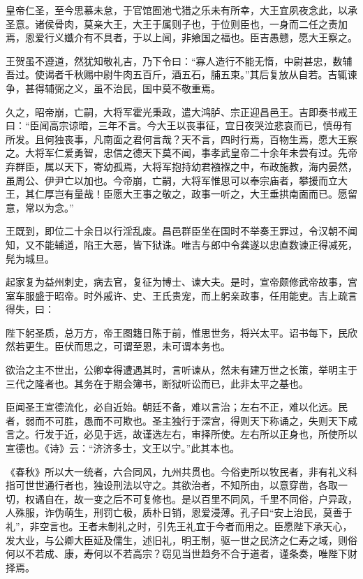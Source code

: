 \documentclass[]{article}
\begin{document}
皇帝仁圣，至今思慕未怠，于官馆囿池弋猎之乐未有所幸，大王宜夙夜念此，以承圣意。诸侯骨肉，莫亲大王，大王于属则子也，于位则臣也，一身而二任之责加焉，恩爱行义孅介有不具者，于以上闻，非飨国之福也。臣吉愚戆，愿大王察之。

王贺虽不遵道，然犹知敬礼吉，乃下令曰：``寡人造行不能无惰，中尉甚忠，数辅吾过。使谒者千秋赐中尉牛肉五百斤，酒五石，脯五束。''其后复放从自若。吉辄谏争，甚得辅弼之义，虽不治民，国中莫不敬重焉。

久之，昭帝崩，亡嗣，大将军霍光秉政，遣大鸿胪、宗正迎昌邑王。吉即奏书戒王曰：``臣闻高宗谅暗，三年不言。今大王以丧事征，宜日夜哭泣悲哀而已，慎毋有所发。且何独丧事，凡南面之君何言哉？天不言，四时行焉，百物生焉，愿大王察之。大将军仁爱勇智，忠信之德天下莫不闻，事孝武皇帝二十余年未尝有过。先帝弃群臣，属以天下，寄幼孤焉，大将军抱持幼君襁褓之中，布政施教，海内晏然，虽周公、伊尹亡以加也。今帝崩，亡嗣，大将军惟思可以奉宗庙者，攀援而立大王，其仁厚岂有量哉！臣愿大王事之敬之，政事一听之，大王垂拱南面而已。愿留意，常以为念。''

王既到，即位二十余日以行淫乱废。昌邑群臣坐在国时不举奏王罪过，令汉朝不闻知，又不能辅道，陷王大恶，皆下狱诛。唯吉与郎中令龚遂以忠直数谏正得减死，髡为城旦。

起家复为益州刺史，病去官，复征为博士、谏大夫。是时，宣帝颇修武帝故事，宫室车服盛于昭帝。时外戚许、史、王氏贵宠，而上躬亲政事，任用能吏。吉上疏言得失，曰：

陛下躬圣质，总万方，帝王图籍日陈于前，惟思世务，将兴太平。诏书每下，民欣然若更生。臣伏而思之，可谓至恩，未可谓本务也。

欲治之主不世出，公卿幸得遭遇其时，言听谏从，然未有建万世之长策，举明主于三代之隆者也。其务在于期会簿书，断狱听讼而已，此非太平之基也。

臣闻圣王宣德流化，必自近始。朝廷不备，难以言治；左右不正，难以化远。民者，弱而不可胜，愚而不可欺也。圣主独行于深宫，得则天下称诵之，失则天下咸言之。行发于近，必见于远，故谨选左右，审择所使。左右所以正身也，所使所以宣德也。《诗》云：``济济多士，文王以宁。''此其本也。

《春秋》所以大一统者，六合同风，九州共贯也。今俗吏所以牧民者，非有礼义科指可世世通行者也，独设刑法以守之。其欲治者，不知所由，以意穿凿，各取一切，权谲自在，故一变之后不可复修也。是以百里不同风，千里不同俗，户异政，人殊服，诈伪萌生，刑罚亡极，质朴日销，恩爱浸薄。孔子曰``安上治民，莫善于礼''，非空言也。王者未制礼之时，引先王礼宜于今者而用之。臣愿陛下承天心，发大业，与公卿大臣延及儒生，述旧礼，明王制，驱一世之民济之仁寿之域，则俗何以不若成、康，寿何以不若高宗？窃见当世趋务不合于道者，谨条奏，唯陛下财择焉。
\end{document}
